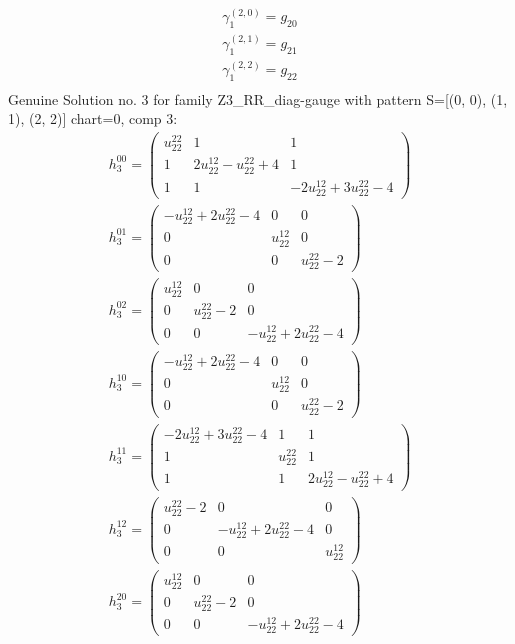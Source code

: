 \documentclass[a4paper, 11pt, twoside, onecolumn]{article}
\begin{document}
\begin{landscape}
\begin{gather*}
	 \gamma^{(2, 0)}_1=g_{20}\\ 
	 \gamma^{(2, 1)}_1=g_{21}\\ 
	 \gamma^{(2, 2)}_1=g_{22}\\ 
\end{gather*} 
Genuine Solution no. 3 for family Z3_RR_diag-gauge with pattern S=[(0, 0), (1, 1), (2, 2)] chart=0, comp 3: 
\begin{gather*} 
	 h_3^{00}=\begin{pmatrix}u^{22}_{22} & 1 & 1\\1 & 2 u^{12}_{22} - u^{22}_{22} + 4 & 1\\1 & 1 & - 2 u^{12}_{22} + 3 u^{22}_{22} - 4\end{pmatrix}\\ 
	 h_3^{01}=\begin{pmatrix}- u^{12}_{22} + 2 u^{22}_{22} - 4 & 0 & 0\\0 & u^{12}_{22} & 0\\0 & 0 & u^{22}_{22} - 2\end{pmatrix}\\ 
	 h_3^{02}=\begin{pmatrix}u^{12}_{22} & 0 & 0\\0 & u^{22}_{22} - 2 & 0\\0 & 0 & - u^{12}_{22} + 2 u^{22}_{22} - 4\end{pmatrix}\\ 
	 h_3^{10}=\begin{pmatrix}- u^{12}_{22} + 2 u^{22}_{22} - 4 & 0 & 0\\0 & u^{12}_{22} & 0\\0 & 0 & u^{22}_{22} - 2\end{pmatrix}\\ 
	 h_3^{11}=\begin{pmatrix}- 2 u^{12}_{22} + 3 u^{22}_{22} - 4 & 1 & 1\\1 & u^{22}_{22} & 1\\1 & 1 & 2 u^{12}_{22} - u^{22}_{22} + 4\end{pmatrix}\\ 
	 h_3^{12}=\begin{pmatrix}u^{22}_{22} - 2 & 0 & 0\\0 & - u^{12}_{22} + 2 u^{22}_{22} - 4 & 0\\0 & 0 & u^{12}_{22}\end{pmatrix}\\ 
	 h_3^{20}=\begin{pmatrix}u^{12}_{22} & 0 & 0\\0 & u^{22}_{22} - 2 & 0\\0 & 0 & - u^{12}_{22} + 2 u^{22}_{22} - 4\end{pmatrix}\\ 

\end{gather*}
\end{landscape}
\end{document}
